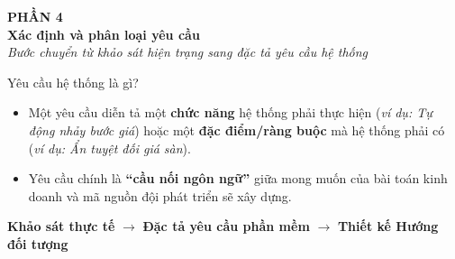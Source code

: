 \documentclass[aspectratio=169, 10pt]{beamer}
\begin{document}
\begin{frame}
    \begin{center}
        \vspace{1.5cm}
        {\Large \textbf{\color{primaryNavy}PHẦN 4}}\\[0.5cm]
        {\huge \textbf{\color{primaryNavy}Xác định và phân loại yêu cầu}}\\[0.6cm]
        \textit{\color{secondarySlate}Bước chuyển từ khảo sát hiện trạng sang đặc tả yêu cầu hệ thống}
    \end{center}
\end{frame}

\begin{frame}{Yêu cầu hệ thống là gì?}
    \begin{itemize}
        \item Một yêu cầu diễn tả một \textbf{chức năng} hệ thống phải thực hiện (\textit{ví dụ: Tự động nhảy bước giá}) hoặc một \textbf{đặc điểm/ràng buộc} mà hệ thống phải có (\textit{ví dụ: Ẩn tuyệt đối giá sàn}).
        \item Yêu cầu chính là \textbf{``cầu nối ngôn ngữ''} giữa mong muốn của bài toán kinh doanh và mã nguồn đội phát triển sẽ xây dựng.
    \end{itemize}
    \vspace{0.4cm}
    \begin{center}
        \colorbox{primaryNavy!10}{\textbf{Khảo sát thực tế} $\longrightarrow$ \textbf{Đặc tả yêu cầu phần mềm} $\longrightarrow$ \textbf{Thiết kế Hướng đối tượng}}
    \end{center}
\end{frame}
\end{document}
